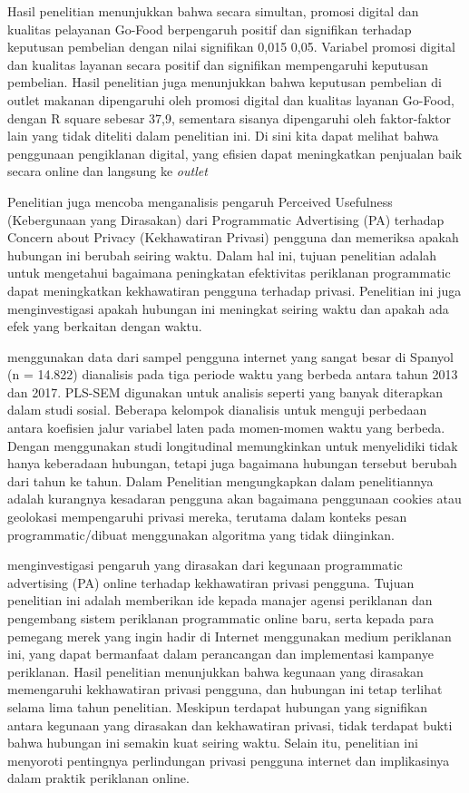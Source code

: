 \documentclass{article}
\begin{document}
Hasil penelitian \cite{mahmud2023analisis} menunjukkan bahwa secara simultan, promosi digital dan kualitas pelayanan Go-Food berpengaruh positif dan signifikan terhadap keputusan pembelian dengan nilai signifikan 0,015  0,05. Variabel promosi digital dan kualitas layanan secara positif dan signifikan mempengaruhi keputusan pembelian. Hasil penelitian juga menunjukkan bahwa keputusan pembelian di outlet makanan dipengaruhi oleh promosi digital dan kualitas layanan Go-Food, dengan R square sebesar 37,9, sementara sisanya dipengaruhi oleh faktor-faktor lain yang tidak diteliti dalam penelitian ini. Di sini kita dapat melihat bahwa penggunaan pengiklanan digital, yang efisien dapat meningkatkan penjualan baik secara online dan langsung ke \emph{outlet}

Penelitian \cite{PALO1961} juga mencoba menganalisis pengaruh Perceived Usefulness (Kebergunaan yang Dirasakan) dari Programmatic Advertising (PA) terhadap Concern about Privacy (Kekhawatiran Privasi) pengguna dan memeriksa apakah hubungan ini berubah seiring waktu. Dalam hal ini, tujuan penelitian adalah untuk mengetahui bagaimana peningkatan efektivitas periklanan programmatic dapat meningkatkan kekhawatiran pengguna terhadap privasi. Penelitian ini juga menginvestigasi apakah hubungan ini meningkat seiring waktu dan apakah ada efek yang berkaitan dengan waktu. 

\cite{PALO1961} menggunakan data dari sampel pengguna internet yang sangat besar di Spanyol (n = 14.822) dianalisis pada tiga periode waktu yang berbeda antara tahun 2013 dan 2017. PLS-SEM digunakan untuk analisis seperti yang banyak diterapkan dalam studi sosial. Beberapa kelompok dianalisis untuk menguji perbedaan antara koefisien jalur variabel laten pada momen-momen waktu yang berbeda. Dengan menggunakan studi longitudinal memungkinkan untuk menyelidiki tidak hanya keberadaan hubungan, tetapi juga bagaimana hubungan tersebut berubah dari tahun ke tahun. Dalam Penelitian \cite{PALO1961} mengungkapkan dalam penelitiannya adalah kurangnya kesadaran pengguna akan bagaimana penggunaan cookies atau geolokasi mempengaruhi privasi mereka, terutama dalam konteks pesan programmatic/dibuat menggunakan algoritma yang tidak diinginkan.  

\cite{PALO1961} menginvestigasi pengaruh yang dirasakan dari kegunaan programmatic advertising (PA) online terhadap kekhawatiran privasi pengguna. Tujuan penelitian ini adalah memberikan ide kepada manajer agensi periklanan dan pengembang sistem periklanan programmatic online baru, serta kepada para pemegang merek yang ingin hadir di Internet menggunakan medium periklanan ini, yang dapat bermanfaat dalam perancangan dan implementasi kampanye periklanan. Hasil penelitian menunjukkan bahwa kegunaan yang dirasakan memengaruhi kekhawatiran privasi pengguna, dan hubungan ini tetap terlihat selama lima tahun penelitian. Meskipun terdapat hubungan yang signifikan antara kegunaan yang dirasakan dan kekhawatiran privasi, tidak terdapat bukti bahwa hubungan ini semakin kuat seiring waktu. Selain itu, penelitian ini menyoroti pentingnya perlindungan privasi pengguna internet dan implikasinya dalam praktik periklanan online.
\end{document}
